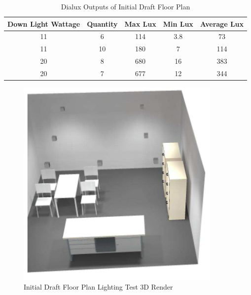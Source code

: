 \begin{table}[!ht]
\centering
\renewcommand{\arraystretch}{1}
\begin{tabular}{|c|c|c|c|c|}
\hline
\multicolumn{1}{|l|}{\textbf{Down Light Wattage}} & \multicolumn{1}{l|}{\textbf{Quantity}} & \multicolumn{1}{l|}{\textbf{Max Lux}} & \multicolumn{1}{l|}{\textbf{Min Lux}} & \multicolumn{1}{l|}{\textbf{Average Lux}} \\ \hline
11 & 6 & 114 & 3.8 & 73 \\ \hline
11 & 10 & 180 & 7 & 114 \\ \hline
20 & 8 & 680 & 16 & 383 \\ \hline
20 & 7 & 677 & 12 & 344 \\ \hline
\end{tabular}
\caption{Dialux Outputs of Initial Draft Floor Plan}
\label{table:draftFloorPlanDialuxOutputs}
\end{table} 

\begin{figure}[H]
\hfill\includegraphics[width = 100mm]{images/lighting_draft_3D}\hspace*{\fill}
\caption{Initial Draft Floor Plan Lighting Test 3D Render} 
\label{fig:DraftLighting3D}
\end{figure} 

